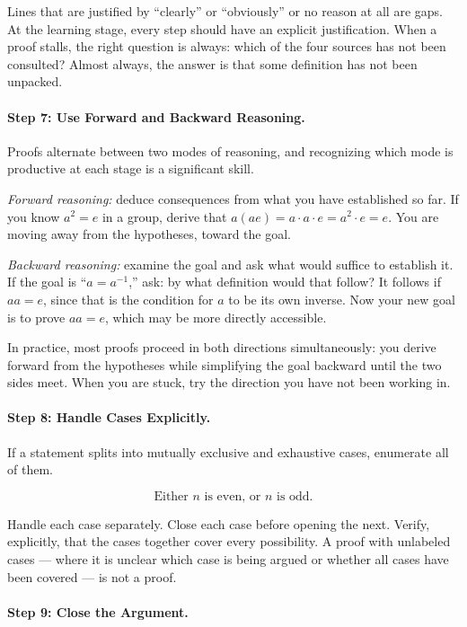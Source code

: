Lines that are justified by ``clearly'' or ``obviously'' or no reason at
all are gaps. At the learning stage, every step should have an explicit
justification. When a proof stalls, the right question is always: which
of the four sources has not been consulted? Almost always, the answer is
that some definition has not been unpacked.

\paragraph{Step 7: Use Forward and Backward Reasoning.}

Proofs alternate between two modes of reasoning, and recognizing which
mode is productive at each stage is a significant skill.

\emph{Forward reasoning:} deduce consequences from what you have
established so far. If you know $a^2 = e$ in a group, derive that
$a(ae) = a \cdot a \cdot e = a^2 \cdot e = e$. You are moving away
from the hypotheses, toward the goal.

\emph{Backward reasoning:} examine the goal and ask what would
suffice to establish it. If the goal is ``$a = a^{-1}$,'' ask: by
what definition would that follow? It follows if $aa = e$, since
that is the condition for $a$ to be its own inverse. Now your new
goal is to prove $aa = e$, which may be more directly accessible.

In practice, most proofs proceed in both directions simultaneously:
you derive forward from the hypotheses while simplifying the goal
backward until the two sides meet. When you are stuck, try the
direction you have not been working in.

\paragraph{Step 8: Handle Cases Explicitly.}

If a statement splits into mutually exclusive and exhaustive cases,
enumerate all of them.

\[
\text{Either } n \text{ is even, or } n \text{ is odd.}
\]

Handle each case separately. Close each case before opening the next.
Verify, explicitly, that the cases together cover every possibility.
A proof with unlabeled cases --- where it is unclear which case is
being argued or whether all cases have been covered --- is not a proof.

\paragraph{Step 9: Close the Argument.}

